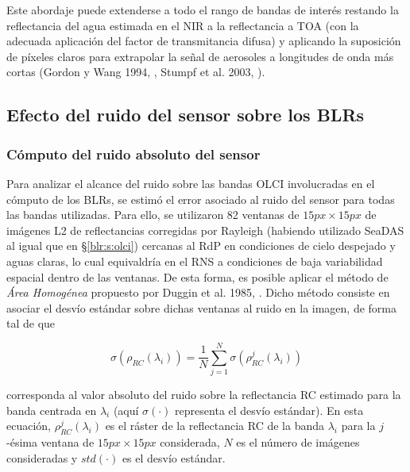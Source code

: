     
    Este abordaje puede extenderse a todo el rango de bandas de interés restando la reflectancia del agua estimada en el NIR a la reflectancia a TOA (con la adecuada aplicación del factor de transmitancia difusa) y aplicando la suposición de píxeles claros para extrapolar la señal de aerosoles a longitudes de onda más cortas (Gordon y Wang 1994, \cite{gordon1994}, Stumpf et al. 2003, \cite{stumpf2003}).
    
    \subsection{Efecto del ruido del sensor sobre los BLRs}
    \label{blr:s:blrNoise}

        \subsubsection{Cómputo del ruido absoluto del sensor}
        \label{blr:s:blrNoiseHA}
            Para analizar el alcance del ruido sobre las bandas OLCI involucradas en el cómputo de los BLRs, se estimó el error asociado al ruido del sensor para todas las bandas utilizadas. Para ello, se utilizaron 82 ventanas de $15 px \times 15 px$ de imágenes L2 de reflectancias corregidas por Rayleigh (habiendo utilizado SeaDAS al igual que en \S \ref{blr:s:olci}) cercanas al RdP en condiciones de cielo despejado y aguas claras, lo cual equivaldría en el RNS a condiciones de baja variabilidad espacial dentro de las ventanas. De esta forma, es posible aplicar el método de \textit{Área Homogénea} propuesto por Duggin et al. 1985, \cite{duggin1985}. Dicho método consiste en asociar el desvío estándar sobre dichas ventanas al ruido en la imagen, de forma tal de que
            
            \begin{equation}
                \sigma(\rho_{RC}(\lambda_{i})) = \frac{1}{N}\sum_{j=1}^{N} \sigma(\rho_{RC}^{j}(\lambda_{i}))
                \label{blr:eq:noiseHA}
            \end{equation}
            
            \noindent
            corresponda al valor absoluto del ruido sobre la reflectancia RC estimado para la banda centrada en $\lambda_{i}$ (aquí $\sigma(\cdot)$ representa el desvío estándar). En esta ecuación, $\rho_{RC}^{j}(\lambda_{i})$ es el ráster de la reflectancia RC de la banda $\lambda_{i}$ para la $j$-ésima ventana de 
            $15 px \times 15 px$ considerada, $N$ es el número de imágenes consideradas y $std(\cdot)$ es el desvío estándar.
            
